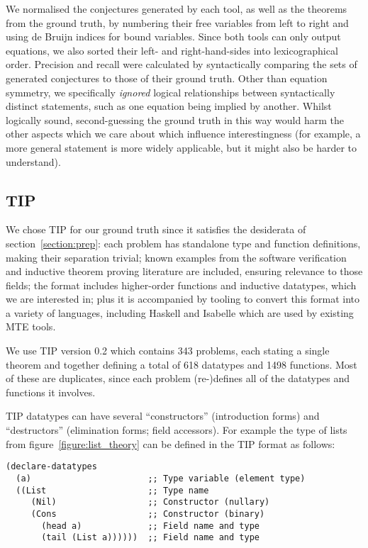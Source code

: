 We normalised the conjectures generated by each tool, as well as the theorems
from the ground truth, by numbering their free variables from left to right and
using de Bruijn indices for bound variables. Since both tools can only output
equations, we also sorted their left- and right-hand-sides into lexicographical
order. Precision and recall were calculated by syntactically comparing the sets
of generated conjectures to those of their ground truth. Other than equation
symmetry, we specifically \emph{ignored} logical relationships between
syntactically distinct statements, such as one equation being implied by
another. Whilst logically sound, second-guessing the ground truth in this way
would harm the other aspects which we care about which influence interestingness
(for example, a more general statement is more widely applicable, but it might
also be harder to understand).

\subsection{TIP}

We chose TIP for our ground truth since it satisfies the desiderata of
section~\ref{section:prep}: each problem has standalone type and function
definitions, making their separation trivial; known examples from the software
verification and inductive theorem proving literature are included, ensuring
relevance to those fields; the format includes higher-order functions and
inductive datatypes, which we are interested in; plus it is accompanied by
tooling to convert this format into a variety of languages, including Haskell
and Isabelle which are used by existing MTE tools.

We use TIP version 0.2 which contains 343 problems, each stating a single
theorem and together defining a total of 618 datatypes and 1498 functions. Most
of these are duplicates, since each problem (re\nobreakdash-)defines all of the
datatypes and functions it involves.

TIP datatypes can have several ``constructors'' (introduction forms) and
``destructors'' (elimination forms; field accessors). For example the type of
lists from figure~\ref{figure:list_theory} can be defined in the TIP format as
follows:

\begin{verbatim}
(declare-datatypes
  (a)                       ;; Type variable (element type)
  ((List                    ;; Type name
     (Nil)                  ;; Constructor (nullary)
     (Cons                  ;; Constructor (binary)
       (head a)             ;; Field name and type
       (tail (List a))))))  ;; Field name and type
\end{verbatim}

